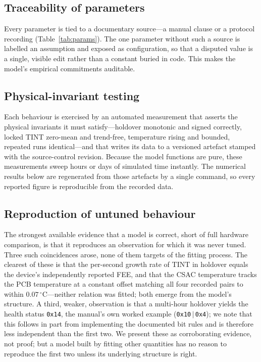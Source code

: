 \documentclass[conference]{IEEEtran}
\begin{document}
\subsection{Traceability of parameters}
Every parameter is tied to a documentary source---a manual clause or a
protocol recording (Table~\ref{tab:params}). The one parameter without
such a source is labelled an assumption and exposed as configuration, so
that a disputed value is a single, visible edit rather than a constant
buried in code. This makes the model's empirical commitments auditable.

\subsection{Physical-invariant testing}
Each behaviour is exercised by an automated measurement that asserts the
physical invariants it must satisfy---holdover monotonic and signed
correctly, locked TINT zero-mean and trend-free, temperature rising and
bounded, repeated runs identical---and that writes its data to a
versioned artefact stamped with the source-control revision. Because the
model functions are pure, these measurements sweep hours or days of
simulated time instantly. The numerical results below are regenerated
from those artefacts by a single command, so every reported figure is
reproducible from the recorded data.

\subsection{Reproduction of untuned behaviour}
The strongest available evidence that a model is correct, short of full
hardware comparison, is that it reproduces an observation for which it
was never tuned. Three such coincidences arose, none of them targets of
the fitting process. The clearest of these is that the per-second growth rate of TINT in
holdover equals the device's independently reported FEE, and that the
CSAC temperature tracks the PCB temperature at a constant offset
matching all four recorded pairs to within $0.07\,^\circ$C---neither
relation was fitted; both emerge from the model's structure. A third,
weaker, observation is that a multi-hour holdover yields the health
status \texttt{0x14}, the manual's own worked example
(\texttt{0x10}\,$\vert$\,\texttt{0x4}); we note that this follows in
part from implementing the documented bit rules and is therefore less
independent than the first two. We present these as corroborating
evidence, not proof; but a model built by fitting other quantities has
no reason to reproduce the first two unless its underlying structure is
right.
\end{document}
